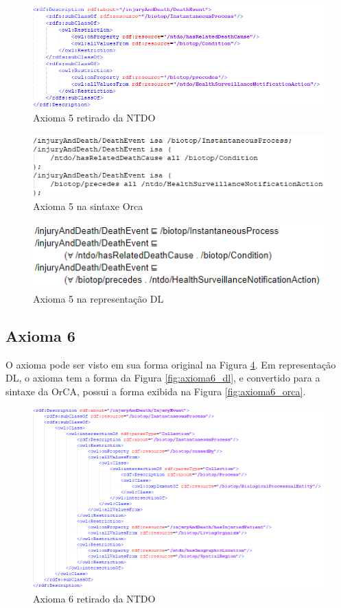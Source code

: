 \documentclass{bcc}
\begin{document}
\begin{figure}[H]
\centering
\includegraphics[width=1\textwidth]{Figuras/axioma5_o.png}
\caption{Axioma 5 retirado da NTDO} 
\label{fig:axioma5_o}
\end{figure}

\begin{figure}[H]
\centering
\includegraphics[width=.7\textwidth]{Figuras/axioma5_orca.png}
\caption{Axioma 5 na sintaxe Orca} 
\label{fig:axioma5_orca}
\end{figure}

\begin{figure}[H]
\centering
\includegraphics[width=.7\textwidth]{Figuras/axioma5_dl.png}
\caption{Axioma 5 na representação DL} 
\label{fig:axioma5_dl}
\end{figure}

\subsection{Axioma 6}
O axioma pode ser visto em sua forma original na Figura \ref{fig:axioma6_o}. Em representação DL, o axioma tem a forma da Figura \ref{fig:axioma6_dl}, e convertido para a sintaxe da OrCA, possui a forma exibida na Figura \ref{fig:axioma6_orca}. 

\begin{figure}[H]
\centering
\includegraphics[width=1\textwidth]{Figuras/axioma6_o.png}
\caption{Axioma 6 retirado da NTDO} 
\label{fig:axioma6_o}
\end{figure}
\end{document}
